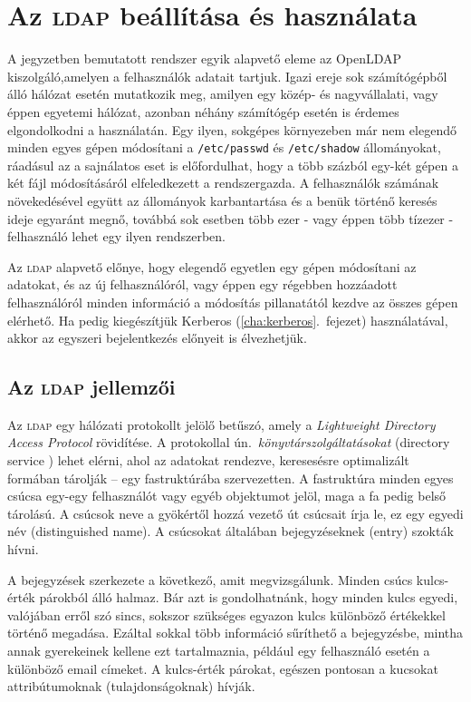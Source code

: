 \chapter{Az \textsc{ldap} beállítása és használata}\label{cha:ldap}

A jegyzetben bemutatott rendszer egyik alapvető eleme az OpenLDAP kiszolgáló,amelyen a felhasználók adatait
tartjuk. Igazi ereje sok számítógépből álló hálózat esetén mutatkozik meg,  amilyen egy közép- és nagyvállalati, vagy
éppen egyetemi hálózat, azonban néhány számítógép esetén is érdemes elgondolkodni a használatán.  Egy ilyen, sokgépes
környezeben már nem elegendő  minden egyes gépen módosítani a \texttt{/etc/passwd} és \texttt{/etc/shadow} állományokat,
ráadásul az a sajnálatos eset is előfordulhat, hogy a több százból egy-két gépen a két fájl módosításáról elfeledkezett
a rendszergazda. A felhasználók számának növekedésével együtt az állományok karbantartása és a benük történő keresés
ideje egyaránt megnő, továbbá sok esetben több ezer - vagy éppen több tízezer - felhasználó lehet egy ilyen rendszerben.

Az \textsc{ldap} alapvető előnye, hogy elegendő egyetlen egy gépen módosítani az adatokat, és az új felhasználóról, vagy
éppen egy régebben hozzáadott felhasználóról  minden információ a módosítás pillanatától kezdve az összes gépen
elérhető.  Ha pedig kiegészítjük Kerberos (\ref{cha:kerberos}.\ fejezet) használatával, akkor az egyszeri bejelentkezés
előnyeit is élvezhetjük.


\section{Az \textsc{ldap} jellemzői}

Az \textsc{ldap}  egy hálózati protokollt jelölő betűszó, amely a {\em Lightweight Directory Access Protocol}
rövidítése. A protokollal ún.\ \emph{könyvtárszolgáltatásokat}  (directory service \cite{dirservice}) lehet elérni, ahol
az adatokat rendezve, keresesésre optimalizált formában tárolják -- egy fastruktúrába szervezetten. A fastruktúra minden
egyes csúcsa egy-egy felhasználót vagy egyéb objektumot jelöl, maga a fa pedig belső tárolású. A csúcsok neve a
gyökértől hozzá vezető út csúcsait írja le, ez egy egyedi név (distinguished name). A csúcsokat általában bejegyzéseknek
(entry) szokták hívni.

A bejegyzések szerkezete a következő, amit megvizsgálunk. Minden csúcs kulcs-érték párokból álló halmaz. Bár azt is
gondolhatnánk, hogy minden kulcs egyedi, valójában erről szó sincs, sokszor szükséges egyazon kulcs különböző értékekkel
történő megadása. Ezáltal sokkal több információ sűríthető a bejegyzésbe, mintha annak gyerekeinek kellene ezt
tartalmaznia, például egy felhasználó esetén a különböző email címeket. A kulcs-érték párokat, egészen pontosan a
kucsokat attribútumoknak (tulajdonságoknak) hívják.

